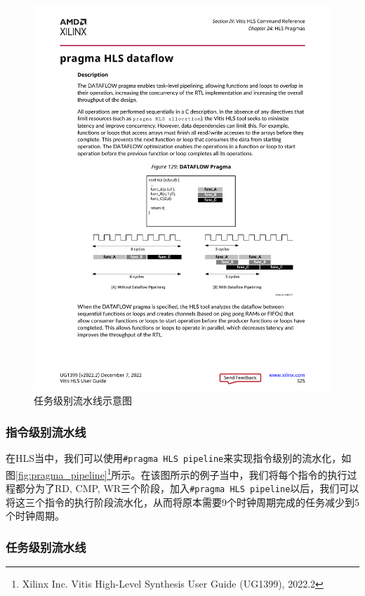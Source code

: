 \begin{figure}[htbp]
    \centering
    \includegraphics[width=\linewidth]{figures/pragma dataflow.pdf}
    \caption{任务级别流水线示意图}
    \label{fig:pragma_dataflow}
\end{figure}
\subsubsection{指令级别流水线}
在HLS当中，我们可以使用\verb|#pragma HLS pipeline|来实现指令级别的流水化，如图\ref{fig:pragma_pipeline}\footnote{Xilinx Inc. Vitis High-Level Synthesis User Guide (UG1399), 2022.2\label{ug1399}}所示。在该图所示的例子当中，我们将每个指令的执行过程都分为了RD, CMP, WR三个阶段，加入\verb|#pragma HLS pipeline|以后，我们可以将这三个指令的执行阶段流水化，从而将原本需要9个时钟周期完成的任务减少到5个时钟周期。


\subsubsection{任务级别流水线}

